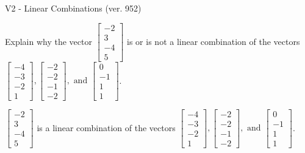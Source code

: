 \begin{exercise}
  \begin{exerciseTitle}V2 - Linear Combinations (ver. 952)\end{exerciseTitle}
  \begin{exerciseStatement}
    Explain why the vector \(\left[\begin{array}{c}
-2 \\
3 \\
-4 \\
5
\end{array}\right]\)  is or is not a linear 
	combination of the vectors \(\left[\begin{array}{c}
-4 \\
-3 \\
-2 \\
1
\end{array}\right] , \left[\begin{array}{c}
-2 \\
-2 \\
-1 \\
-2
\end{array}\right] , \text{ and } \left[\begin{array}{c}
0 \\
-1 \\
1 \\
1
\end{array}\right]\).
	


  \end{exerciseStatement}
  \begin{exerciseAnswer}
   \(\left[\begin{array}{c}
-2 \\
3 \\
-4 \\
5
\end{array}\right]\) 
  	 is  
	a linear combination of the vectors \(\left[\begin{array}{c}
-4 \\
-3 \\
-2 \\
1
\end{array}\right] , \left[\begin{array}{c}
-2 \\
-2 \\
-1 \\
-2
\end{array}\right] , \text{ and } \left[\begin{array}{c}
0 \\
-1 \\
1 \\
1
\end{array}\right]\).

	
  


  \end{exerciseAnswer}
\end{exercise}